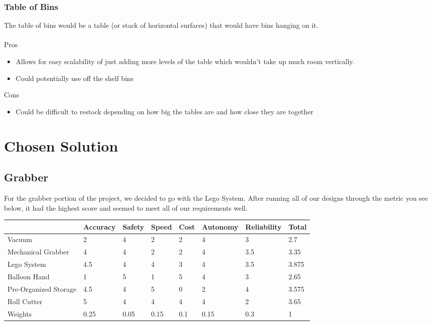 \documentclass[12pt]{report}
\begin{document}
\subsubsection*{Table of Bins}
The table of bins would be a table (or stack of horizontal surfaces) that would have bins hanging on it.  \\ \\
Pros
\begin{itemize}
\item Allows for easy scalability of just adding more levels of the table which wouldn't take up much room vertically.
\item Could potentially use off the shelf bins
\end{itemize}
Cons
\begin{itemize}
\item Could be difficult to restock depending on how big the tables are and how close they are together
\end{itemize}

\section*{Chosen Solution}
\subsection*{Grabber}

For the grabber portion of the project, we decided to go with the Lego System. After running all of our designs through the metric you see below, it had the highest score and seemed to meet all of our requirements well.


\begin{minipage}{\linewidth}
\centering
{} \label{tab:grabber} 
\begin{tabular}{|l|l|l|l|l|l|l|l|}
\hline
 & Accuracy & Safety & Speed & Cost & Autonomy & Reliability & Total \\
 \hline
Vacuum & 2 & 4 & 2 & 2 & 4 & 3 & 2.7 \\
Mechanical Grabber & 4 & 4 & 2 & 2 & 4 & 3.5 & 3.35 \\
\rowcolor{green}
Lego System & 4.5 & 4 & 4 & 3 & 4 & 3.5 & 3.875 \\
Balloon Hand & 1 & 5 & 1 & 5 & 4 & 3 & 2.65 \\
Pre-Organized Storage & 4.5 & 4 & 5 & 0 & 2 & 4 & 3.575 \\
Roll Cutter & 5 & 4 & 4 & 4 & 4 & 2 & 3.65 \\
Weights & 0.25 & 0.05 & 0.15 & 0.1 & 0.15 & 0.3 & 1 \\
\hline
\end{tabular}
\end{minipage}
\end{document}
